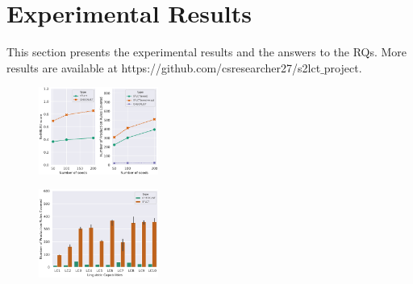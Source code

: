 \section{Experimental Results}
\label{sec:result}

This section presents the experimental results and the answers to the RQs. More results are available at https://github.com/csresearcher27/s2lct$\_$project.


\begin{figure}
    \centering
    \includegraphics[width=0.35\textwidth]{figs/pdr-selfbleu-agg-lineplot.eps}
    \caption{\PdrSelfbleuFigCaption}
\end{figure}




\begin{figure}%
    \centering
    \includegraphics[width=0.35\textwidth]{figs/pdr-ours-50seeds-barplot.eps}
    \caption{\PdrBarplotFigCaption}
\end{figure}

